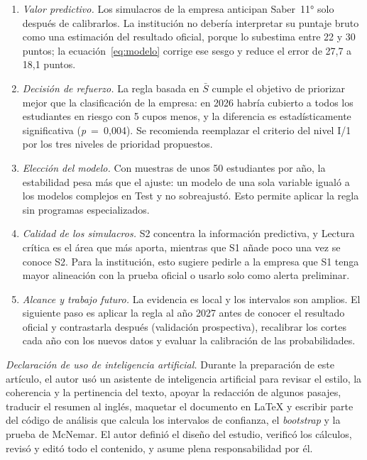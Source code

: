 \documentclass[10pt,letterpaper,twocolumn]{article}
\begin{document}
\begin{enumerate}[leftmargin=*]
    \item \textit{Valor predictivo.} Los simulacros de la empresa anticipan Saber~11° solo después de calibrarlos. La institución no debería interpretar su puntaje bruto como una estimación del resultado oficial, porque lo subestima entre 22 y 30 puntos; la ecuación~\eqref{eq:modelo} corrige ese sesgo y reduce el error de 27,7 a 18,1 puntos.
    \item \textit{Decisión de refuerzo.} La regla basada en $\bar{S}$ cumple el objetivo de priorizar mejor que la clasificación de la empresa: en 2026 habría cubierto a todos los estudiantes en riesgo con 5 cupos menos, y la diferencia es estadísticamente significativa (\textit{p}~=~0,004). Se recomienda reemplazar el criterio del nivel I/1 por los tres niveles de prioridad propuestos.
    \item \textit{Elección del modelo.} Con muestras de unos 50 estudiantes por año, la estabilidad pesa más que el ajuste: un modelo de una sola variable igualó a los modelos complejos en Test y no sobreajustó. Esto permite aplicar la regla sin programas especializados.
    \item \textit{Calidad de los simulacros.} S2 concentra la información predictiva, y Lectura crítica es el área que más aporta, mientras que S1 añade poco una vez se conoce S2. Para la institución, esto sugiere pedirle a la empresa que S1 tenga mayor alineación con la prueba oficial o usarlo solo como alerta preliminar.
    \item \textit{Alcance y trabajo futuro.} La evidencia es local y los intervalos son amplios. El siguiente paso es aplicar la regla al año 2027 antes de conocer el resultado oficial y contrastarla después (validación prospectiva), recalibrar los cortes cada año con los nuevos datos y evaluar la calibración de las probabilidades.
\end{enumerate}

\vspace{4pt}
\noindent\textit{Declaración de uso de inteligencia artificial.} Durante la preparación de este artículo, el autor usó un asistente de inteligencia artificial para revisar el estilo, la coherencia y la pertinencia del texto, apoyar la redacción de algunos pasajes, traducir el resumen al inglés, maquetar el documento en LaTeX y escribir parte del código de análisis que calcula los intervalos de confianza, el \textit{bootstrap} y la prueba de McNemar. El autor definió el diseño del estudio, verificó los cálculos, revisó y editó todo el contenido, y asume plena responsabilidad por él.
\end{document}
